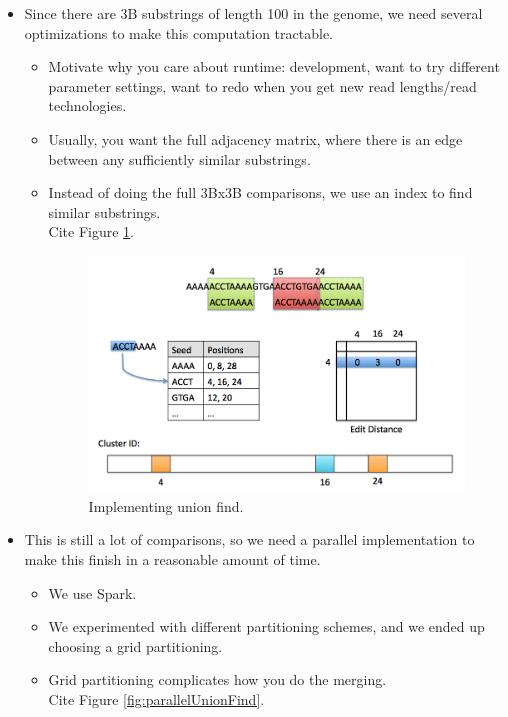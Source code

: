 \documentclass[10pt, conference, compsocconf]{IEEEtran}
\begin{document}
\begin{itemize}
\begin{itemize}
\end{itemize}
\item{Since there are 3B substrings of length 100 in the genome, we need several optimizations to make this computation tractable.}
\begin{itemize}
\item{Motivate why you care about runtime:  development, want to try different parameter settings, want to redo when you get new read lengths/read technologies.}
\item{Usually, you want the full adjacency matrix, where there is an edge between any sufficiently similar substrings.}
\item{Instead of doing the full 3Bx3B comparisons, we use an index to find similar substrings.}\\
Cite Figure \ref{fig:implementingUnionFind}.

\begin{figure}
\centering
\includegraphics[scale=0.4]{implementingUnionFind}
\caption{Implementing union find.}
\label{fig:implementingUnionFind}
\end{figure}

\end{itemize}
\item{This is still a lot of comparisons, so we need a parallel implementation to make this finish in a reasonable amount of time.}
\begin{itemize}
\item{We use Spark.}
\item{We experimented with different partitioning schemes, and we ended up choosing a grid partitioning.}
\item{Grid partitioning complicates how you do the merging.}\\
Cite Figure \ref{fig:parallelUnionFind}.


\end{itemize}
\end{itemize}
\end{document}
